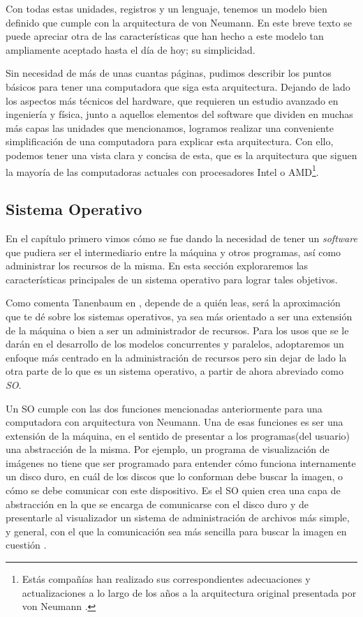 \documentclass[letterpaper,12pt,oneside]{book}
\begin{document}
		Con todas estas unidades, registros y un lenguaje, tenemos un modelo bien definido que cumple con la arquitectura de von Neumann. En este breve 
		texto se puede apreciar otra de las características que han hecho a este modelo tan ampliamente aceptado hasta el día de hoy; su simplicidad.

		Sin 
		necesidad
		de más de unas cuantas páginas, pudimos describir los puntos básicos para tener una computadora que siga esta arquitectura. Dejando de lado  los aspectos más técnicos del hardware, que requieren
		un estudio avanzado en ingeniería y física, junto a aquellos elementos del software que dividen en muchas más capas las unidades que mencionamos, logramos realizar una conveniente simplificación de una computadora para explicar esta arquitectura. Con ello, podemos
		tener una vista clara y concisa de esta, que es la arquitectura que siguen la mayoría de las computadoras actuales con
		procesadores Intel o AMD\footnote{Estás compañías han realizado sus
		correspondientes adecuaciones y actualizaciones a lo largo de los años a la arquitectura original presentada por von Neumann \cite{tanenbaum_structured_2013}.}.		
		
		\subsection{Sistema Operativo}   
		
		En el capítulo primero vimos cómo se fue dando la necesidad de tener un \textit{software} que pudiera ser el intermediario entre la máquina
		y otros programas, así como administrar los recursos de la misma. En esta sección exploraremos las características principales
		de un sistema operativo para lograr tales objetivos.
		
		Como comenta Tanenbaum en \cite{tanenbaum_modern_2002}, depende de a quién leas, será la aproximación que te dé sobre los sistemas operativos,
		ya sea más orientado a ser una extensión de la máquina o bien a ser un administrador de recursos. Para los usos que se le darán en el desarrollo
		de los modelos concurrentes y paralelos, adoptaremos un enfoque más centrado en la administración de recursos pero sin dejar de lado
		la otra parte de lo que es un sistema operativo, a partir de ahora abreviado como \textit{SO}.
		
		Un SO cumple con las dos funciones mencionadas anteriormente para una computadora con arquitectura von Neumann. Una
		de esas funciones es ser una extensión de la máquina, en el sentido de presentar a los programas(del usuario) una abstracción de la misma.
        Por ejemplo, un programa de visualización de imágenes no tiene que ser programado para entender cómo funciona internamente un disco 
		duro, en cuál de los discos que lo conforman debe buscar la imagen, o cómo se debe comunicar con este dispositivo. Es el SO quien crea
		una capa de abstracción en la que se encarga de comunicarse con el disco duro y de presentarle al visualizador un sistema de administración de
		archivos más simple, y general, con el que la comunicación sea más sencilla para buscar la imagen en cuestión \cite{tanenbaum_modern_2002}.
  
\end{document}
